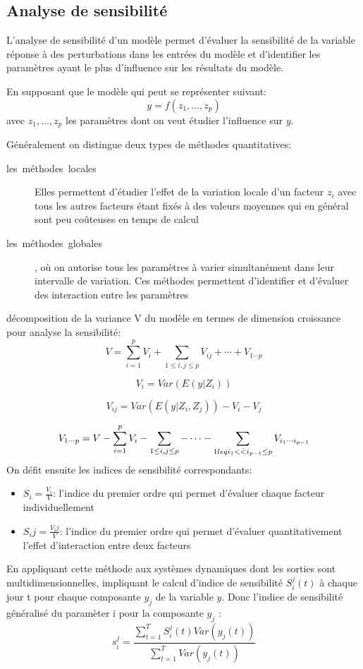 \subsection{Analyse de sensibilité}
L'analyse de sensibilité d'un modèle permet d'évaluer la sensibilité de la
variable réponse à des perturbations dans les entrées du modèle et
d'identifier les paramètres ayant le plus d'influence
sur les résultats du modèle.

En supposant que le modèle qui peut se représenter suivant:
\[
  y = f(z_1,\dots,z_p)
\]
avec $z_1,\dots ,z_p$ les paramètres dont on veut étudier l'influence sur $y$.

Généralement on distingue deux types de méthodes quantitatives:
\begin{description}
  \item[les\ méthodes\ locales] Elles permettent d'étudier l'effet de la
variation locale d'un facteur $z_i$ avec tous les autres facteurs étant fixés à des valeurs moyennes qui en général sont peu coûteuses en temps de calcul
\item[les\ méthodes\ globales], où on autorise tous les paramètres à varier simultanément dans leur intervalle de variation. Ces méthodes permettent d'identifier et d'évaluer des interaction entre les paramètres
\end{description}
 décomposition de la variance V du modèle en termes de dimension croissance pour analyse la sensibilité:
\[ {V}=\sum_{i=1}^pV_i+\sum_{1\leq i,j \leq p} V_{ij}+\cdots +V_{1\cdots p}\]

\[ {V_i}=Var(E(y|Z_i))\]

\[ {V_{ij}}=Var(E(y|Z_i,Z_j))-V_i-V_j \]

\[ {V_{1\cdots p}}=V-\sum_{i=1}^p V_i-\sum_{1\leq i,j \leq p}-\cdots -\sum_{1\\leq i_1<\dot <i_{p-1}\leq p} V_{i_1 \cdots i_{p-1}} \]
On défit ensuite les indices de sensibilité correspondants:
\begin{itemize}
\item $S_i=\frac{V_i}{V}$: l'indice du premier ordre qui permet d'évaluer chaque facteur individuellement
\item $S_ij=\frac{V_ij}{V}$: l'indice du premier ordre qui permet d'évaluer quantitativement l'effet d'interaction entre deux facteurs
\end{itemize}
En appliquant cette méthode aux systèmes dynamiques dont les sorties sont multidimensionnelles, impliquant le calcul d'indice de sensibilité $S_i^j(t)$ à chaque jour t pour chaque composante $y_j$ de la variable $y$.
Donc l'indice de sensibilité généralisé du paramèter i  pour la composante $y_j$ :
\[ {s_i^j}=\frac{\sum_{t=1}^TS_i^j(t)Var(y_j(t))}{\sum_{t=1}^T Var(y_j(t))} \]